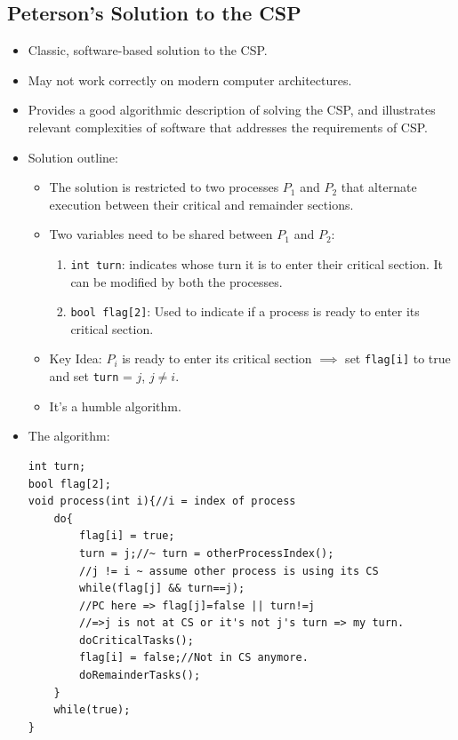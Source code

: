 \documentclass[10pt]{report}
\begin{document}
\subsection{Peterson's Solution to the CSP}
\begin{itemize}
\item Classic, software-based solution to the CSP.
\item May not work correctly on modern computer architectures.
\item Provides a good algorithmic description of solving the CSP, and illustrates relevant complexities of software that addresses the requirements of CSP.
\item Solution outline:
\begin{itemize}
\item The solution is restricted to two processes $P_1$ and $P_2$ that alternate execution between their critical and remainder sections.
\item Two variables need to be shared between $P_1$ and $P_2$:
\begin{enumerate}
    \item \texttt{int turn}: indicates whose turn it is to enter their critical section. It can be modified by both the processes.
    \item \texttt{bool flag[2]}: Used to indicate if a process is ready to enter its critical section.
\end{enumerate}
\item Key Idea: $P_i$ is ready to enter its critical section $\implies $ set \texttt{flag[i]} to true and set \texttt{turn} = $j$, $j \neq i$.
\item It's a humble algorithm.
\end{itemize}
\item The algorithm:
\begin{lstlisting}
int turn;
bool flag[2];
void process(int i){//i = index of process
    do{
        flag[i] = true;
        turn = j;//~ turn = otherProcessIndex();
        //j != i ~ assume other process is using its CS
        while(flag[j] && turn==j);
        //PC here => flag[j]=false || turn!=j
        //=>j is not at CS or it's not j's turn => my turn.
        doCriticalTasks();
        flag[i] = false;//Not in CS anymore.
        doRemainderTasks();
    }
    while(true);
}
\end{lstlisting}
\end{itemize}
\end{document}
